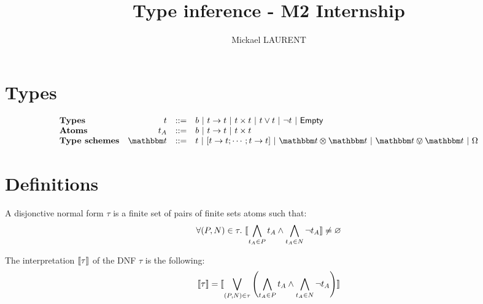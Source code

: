 \documentclass[a4paper]{article}
\title{\vspace{1.5cm}Type inference - M2 Internship}
\author{Mickael LAURENT}
\date{\vspace{-5ex}}
\theoremstyle{definition}
\begin{document}
  \maketitle
  
    \section{Types}

    \[
        \begin{array}{lrcl}
        \textbf{Types} & t & ::= & b\alt \arrow t t\alt \pair t t\alt t\vee t \alt \neg t \alt \Empty\\
        \textbf{Atoms} & t_A & ::= & b\alt \arrow t t\alt \pair t t\\
        \textbf{Type schemes} & \ts & ::= & t \alt \tsfun {\arrow t t ; \cdots ; \arrow t t} \alt \ts \tstimes \ts \alt \ts \tsor \ts \alt \tsempty
        \end{array}
    \]

    \section{Definitions}

    \begin{definition}[DNF]
      A disjonctive normal form $\tau$ is a finite set of pairs of finite sets atoms such that:
      \[ \forall (P,N)\in \tau.\ {\llbracket \bigwedge_{t_A \in P} t_A \land \bigwedge_{t_A \in N} \neg t_A \rrbracket} \neq \varnothing \]

      The interpretation ${\llbracket \tau \rrbracket}$ of the DNF $\tau$ is the following:
      \[
        {\llbracket \tau \rrbracket} = {\llbracket \bigvee_{(P,N)\in \tau} \left(\bigwedge_{t_A \in P} t_A \land \bigwedge_{t_A \in N} \neg t_A \right) \rrbracket}
      \]
    \end{definition}
\end{document}
